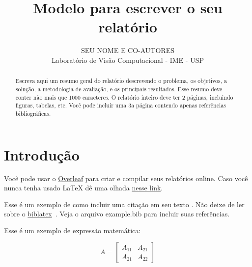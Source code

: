 \documentclass[10pt,a4paper,twocolumn]{article} %
\title{Modelo para escrever o seu relatório}
\author{  SEU NOME E CO-AUTORES\\
    Laboratório de Visão Computacional - IME - USP\\
}
\date{}
\begin{document}
\maketitle %



\begin{abstract}
    Escreva aqui um resumo geral do relatório descrevendo o problema,
    os objetivos, a solução, a metodologia de avaliação, e os principais resultados.
    Esse resumo deve conter não mais que 1000 caracteres.
    O relatório inteiro deve ter 2 páginas, incluindo figuras, tabelas, etc.
    Você pode incluir uma 3a página contendo apenas referências bibliográficas.
\end{abstract}


\section{Introdução}

Você pode usar o \href{https://www.overleaf.com}{Overleaf} para criar e compilar seus relatórios online. Caso você nunca tenha usado \LaTeX{} dê uma olhada \href{https://www.overleaf.com/learn}{nesse link}.

Esse é um exemplo de como incluir uma citação em seu texto \cite{Ref1}. Não deixe de ler sobre o \href{https://www.ctan.org/pkg/}{biblatex}~\cite{Biblatex}. Veja o arquivo example.bib para incluir suas referências.

Esse é um exemplo de expressão matemática:

\begin{equation}
	A = 
	\begin{bmatrix}
		A_{11} & A_{21} \\
		A_{21} & A_{22}
	\end{bmatrix}
\end{equation}

%
\end{document}

